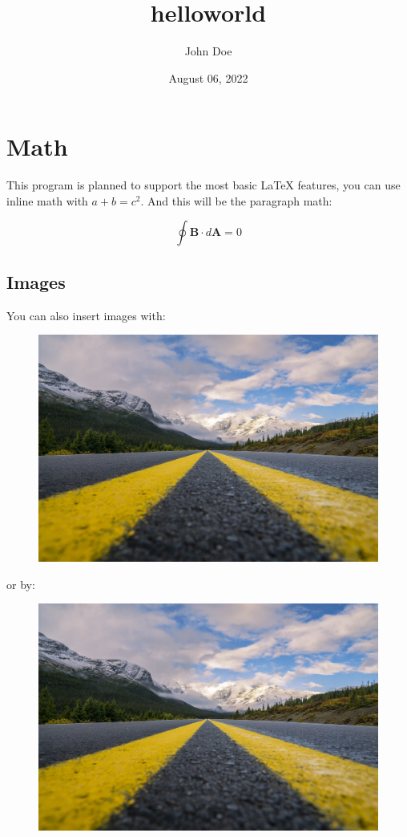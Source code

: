 \documentclass[12pt]{article}
\title{helloworld}
\author{John Doe}
\date{August 06, 2022}
\begin{document}
    \section{Math}

    This program is planned to support the most basic LaTeX features, you can use inline math with $a + b = c^2$. And this will be the paragraph math:

    \begin{equation}
        \oint \boldsymbol{B} \cdot d \boldsymbol{A} = 0
    \end{equation}

    \subsection{Images}

    You can also insert images with:

    \begin{figure}[h]
        \includegraphics[width=\textwidth]{./sample_image.jpeg}
    \end{figure}

    or by:

    \begin{center}
        \begin{figure}[h]
            \includegraphics[width=\textwidth]{./sample_image.jpeg}
        \end{figure}
    \end{center}
\end{document}
